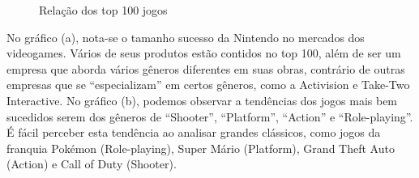 \documentclass[draft]{agujournal2018}
\begin{document}
\begin{figure}[h]
\caption{Relação dos top 100 jogos}\label{fig:unnamed-chunk-9}
\end{figure}

No gráfico (a), nota-se o tamanho sucesso da Nintendo no mercados dos
videogames. Vários de seus produtos estão contidos no top 100, além de
ser um empresa que aborda vários gêneros diferentes em suas obras,
contrário de outras empresas que se ``especializam'' em certos gêneros,
como a Activision e Take-Two Interactive. No gráfico (b), podemos
observar a tendências dos jogos mais bem sucedidos serem dos gêneros de
``Shooter'', ``Platform'', ``Action'' e ``Role-playing''. É fácil
perceber esta tendência ao analisar grandes clássicos, como jogos da
franquia Pokémon (Role-playing), Super Mário (Platform), Grand Theft
Auto (Action) e Call of Duty (Shooter).
\end{document}
